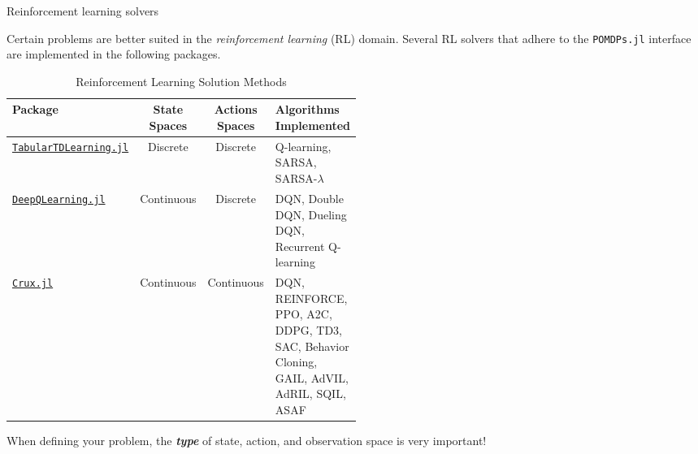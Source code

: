 \begin{frame}{Reinforcement learning solvers}

{\small Certain problems are better suited in the \textit{reinforcement learning} (RL) domain. Several RL solvers that adhere to the \texttt{POMDPs.jl} interface are implemented in the following packages.}

\begin{table}[!t]
    {\tiny
    \centering
    \caption{\label{tab:solutions} Reinforcement Learning Solution Methods}
    \begin{threeparttable}
    \begin{tabular}{lccp{0.5\linewidth}}
        \toprule
        \textbf{Package} & \textbf{State Spaces} & \textbf{Actions Spaces} & \textbf{Algorithms Implemented} \\
        \midrule
        \href{https://github.com/JuliaPOMDP/TabularTDLearning.jl}{\texttt{TabularTDLearning.jl}} & Discrete & Discrete & Q-learning, SARSA, SARSA-$\lambda$ \\
        \href{https://github.com/JuliaPOMDP/DeepQLearning.jl}{\texttt{DeepQLearning.jl}} & Continuous & Discrete & DQN, Double DQN, Dueling DQN, Recurrent Q-learning\\
        \href{https://github.com/ancorso/Crux.jl}{\texttt{Crux.jl}} & Continuous & Continuous & DQN, REINFORCE, PPO, A2C, DDPG, TD3, SAC, Behavior Cloning, GAIL, AdVIL, AdRIL, SQIL, ASAF\\
        \bottomrule
    \end{tabular}
    \end{threeparttable}
    }
\end{table}

{\tiny
\begin{importantblock}
When defining your problem, the \textbf{\textit{type}} of state, action, and observation space is very important!
\end{importantblock}
}

\end{frame}

